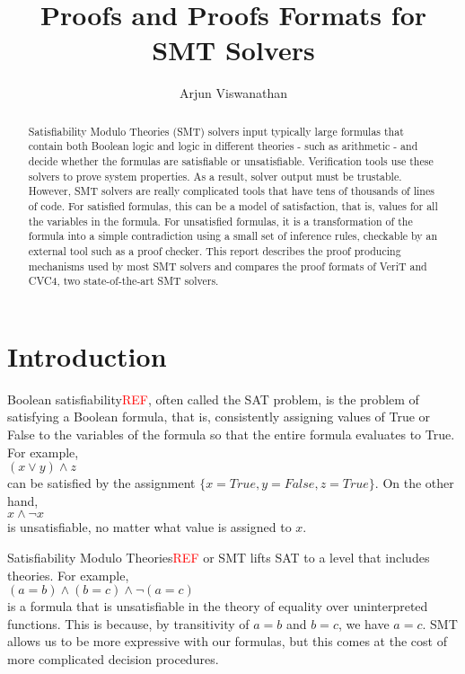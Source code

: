 \documentclass{article}
\begin{document}
\title{Proofs and Proofs Formats for SMT Solvers}
\author{Arjun Viswanathan}
\date{}
\maketitle

\begin{abstract}
Satisfiability Modulo Theories (SMT) solvers input typically
large formulas that contain both Boolean logic and logic in 
different theories - such as arithmetic - and decide whether 
the formulas are satisfiable or unsatisfiable. Verification 
tools use these solvers to prove system properties. As a 
result, solver output must be trustable. However, SMT solvers 
are really complicated tools that have tens of thousands of lines of code. For satisfied formulas, this can be a model of 
satisfaction, that is, values for all the variables in the
formula. For unsatisfied formulas, it is a transformation of 
the formula into a simple contradiction using a small set of 
inference rules, checkable by an external tool such as a proof 
checker. This report describes the proof producing mechanisms 
used by most SMT solvers and compares the proof formats of 
VeriT and CVC4, two state-of-the-art SMT solvers.
\end{abstract}

\section{Introduction}
Boolean satisfiability\textcolor{red}{REF}, often called the SAT problem, 
is the problem of satisfying a Boolean formula, that is, 
consistently assigning values of True or False to the variables 
of the formula so that the entire formula evaluates to True. 
For example, \\ 
$(x \lor y) \land z$ \\
can be satisfied by the 
assignment $\{x=True,y=False,z=True\}$. On the other hand, \\
$x \land \neg x$ \\
is unsatisfiable, no matter what value is assigned to $x$.

Satisfiability Modulo Theories\textcolor{red}{REF} or SMT lifts SAT to a level 
that includes theories. For example, \\
$(a = b) \land (b = c) \land \neg (a = c)$ \\
is a formula that is unsatisfiable in the theory of 
equality over uninterpreted functions. This is because, by
transitivity of $a = b$ and $b = c$, we have $a = c$. SMT 
allows us to be more expressive with our formulas, but 
this comes at the cost of more complicated decision 
procedures.
\end{document}
